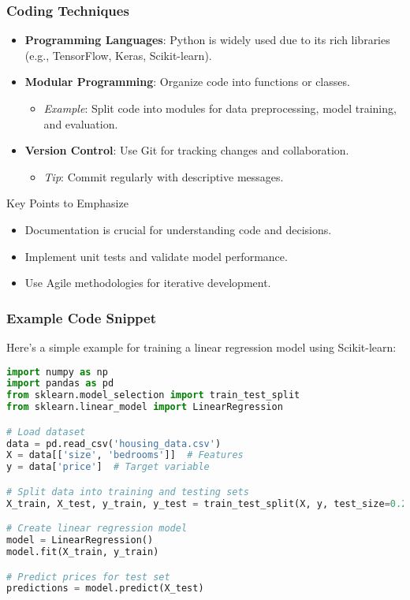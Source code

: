 \documentclass[aspectratio=169]{beamer}
\begin{document}
\begin{frame}[fragile]
    \frametitle{Coding Techniques}
    \begin{itemize}
        \item \textbf{Programming Languages}: Python is widely used due to its rich libraries (e.g., TensorFlow, Keras, Scikit-learn).
        
        \item \textbf{Modular Programming}: Organize code into functions or classes.
        \begin{itemize}
            \item \textit{Example}: Split code into modules for data preprocessing, model training, and evaluation.
        \end{itemize}

        \item \textbf{Version Control}: Use Git for tracking changes and collaboration.
        \begin{itemize}
            \item \textit{Tip}: Commit regularly with descriptive messages.
        \end{itemize}
    \end{itemize}
    
    \begin{block}{Key Points to Emphasize}
        \begin{itemize}
            \item Documentation is crucial for understanding code and decisions.
            \item Implement unit tests and validate model performance.
            \item Use Agile methodologies for iterative development.
        \end{itemize}
    \end{block}
\end{frame}

\begin{frame}[fragile]
    \frametitle{Example Code Snippet}
    Here’s a simple example for training a linear regression model using Scikit-learn:
    \begin{lstlisting}[language=Python]
import numpy as np
import pandas as pd
from sklearn.model_selection import train_test_split
from sklearn.linear_model import LinearRegression

# Load dataset
data = pd.read_csv('housing_data.csv')
X = data[['size', 'bedrooms']]  # Features
y = data['price']  # Target variable

# Split data into training and testing sets
X_train, X_test, y_train, y_test = train_test_split(X, y, test_size=0.2)

# Create linear regression model
model = LinearRegression()
model.fit(X_train, y_train)

# Predict prices for test set
predictions = model.predict(X_test)
    \end{lstlisting}
\end{frame}
\end{document}

